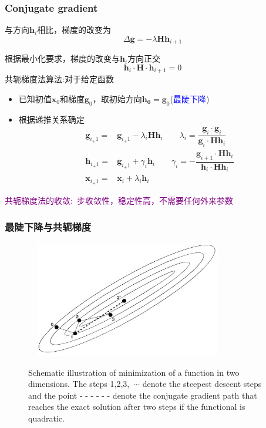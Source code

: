 \frame
{
	\frametitle{\textrm{Conjugate gradient}}
	与方向$\mathbf{h}_i$相比，梯度的改变为
	\begin{displaymath}
		\Delta\mathbf{g}=-\lambda\mathbf{H}\mathbf{h}_{i+1}
	\end{displaymath}

	根据最小化要求，梯度的改变与$\mathbf{h}_i$方向正交
	\begin{displaymath}
		\mathbf{h}_i\cdot\mathbf{H}\cdot\mathbf{h}_{i+1}=0
	\end{displaymath}
	共轭梯度法算法:对于给定函数
	\begin{itemize}
		\item 已知初值$\mathbf{x}_0$和梯度$\mathbf{g}_0$，取初始方向$\mathbf{h_0}=\mathbf{g}_0$(\textcolor{blue}{最陡下降})
		\item 根据递推关系确定
			\begin{displaymath}
				\begin{aligned}
					\mathbf{g}_{i_+1}=&\mathbf{g}_{i_+1}-\lambda_i\mathbf{H}\mathbf{h}_{i}\qquad \lambda_i=\dfrac{\mathbf{g}_i\cdot\mathbf{g}_i}{\mathbf{g}_i\cdot\mathbf{H}\mathbf{h}_i}\\	
					\mathbf{h}_{i_+1}=&\mathbf{g}_{i_+1}+\gamma_i\mathbf{h}_{i}\qquad \gamma_i=-\dfrac{\mathbf{g}_{i+1}\cdot\mathbf{H}\mathbf{h}_i}{\mathbf{h}_i\cdot\mathbf{H}\mathbf{h}_i}\\	
					\mathbf{x}_{i_+1}=&\mathbf{x}_{i}+\lambda_i\mathbf{h}_{i}
				\end{aligned}
			\end{displaymath}
	\end{itemize}
	\textcolor{purple}{共轭梯度法的收敛:~步收敛性，稳定性高，不需要任何外来参数}
}

\frame
{
	\frametitle{最陡下降与共轭梯度}
\begin{figure}[h!]
\centering
\includegraphics[height=2.0in,width=3.5in,viewport=0 0 950 590,clip]{Figures/OP_descent_CG.png}
\label{decent_CG}
\caption{\tiny \textrm{Schematic illustration of minimization of a function in two dimensions. The steps 1,2,3,~$\cdots$ denote the steepest descent steps and the point - \!- \!- \!- \!- \!- denote the conjugate gradient path that reaches the exact solution after two steps if the functional is quadratic.}}%
\end{figure}
}


